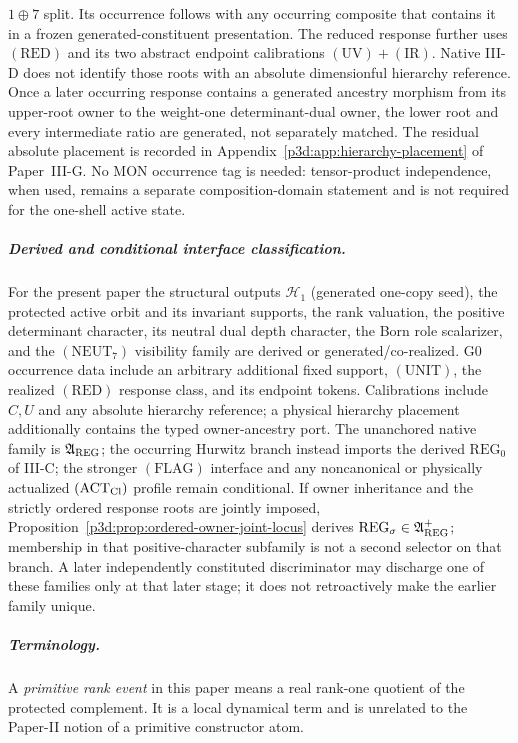 \documentclass[12pt,a4paper]{article}
\begin{document}
\(1\oplus7\) split.  Its occurrence follows with any occurring composite that
contains it in a frozen generated-constituent presentation.  The reduced response further uses
\((\mathrm{RED})\) and its two abstract endpoint calibrations
\((\mathrm{UV})+(\mathrm{IR})\).  Native III-D does not identify those roots
with an absolute dimensionful hierarchy reference.  Once a later occurring
response contains a generated ancestry morphism from its upper-root owner to
the weight-one determinant-dual owner, the lower root and every intermediate
ratio are generated, not separately matched.
The residual absolute placement is recorded in
Appendix~\ref{p3d:app:hierarchy-placement} of Paper~III-G.  No MON
occurrence tag is needed: tensor-product independence, when used, remains a
separate composition-domain statement and is not required for the one-shell
active state.

\subparagraph{Derived and conditional interface classification.}
For the present paper the structural outputs
\(\mathcal H_1\) (generated one-copy seed), the protected active orbit and its invariant
supports, the rank valuation, the positive determinant character, its neutral
dual depth character, the
Born role scalarizer, and the \((\mathrm{NEUT}_7)\) visibility family are
derived or generated/co-realized.  G0 occurrence data include an arbitrary
additional fixed support, \((\mathrm{UNIT})\), the realized
\((\mathrm{RED})\) response class, and its endpoint tokens.  Calibrations
include \(C,U\) and any absolute hierarchy reference; a physical hierarchy
placement additionally contains the typed owner-ancestry port.  The unanchored native family is \(\mathfrak A_{\rm REG}\); the occurring Hurwitz branch instead imports the derived \(\mathrm{REG}_0\) of III-C; the stronger
\((\mathrm{FLAG})\) interface and any noncanonical or physically actualized
\((\mathrm{ACT}_{\rm Cl})\) profile remain conditional.  If owner inheritance and the strictly ordered response roots
are jointly imposed, Proposition~\ref{p3d:prop:ordered-owner-joint-locus}
derives \(\mathrm{REG}_\sigma\in\mathfrak A_{\rm REG}^{+}\); membership in
that positive-character subfamily is not a second selector on that branch.
A later independently constituted discriminator may discharge
one of these families only at that later stage; it does not retroactively make
the earlier family unique.

\subparagraph{Terminology.}
A \emph{primitive rank event} in this paper means a real rank-one quotient of
the protected complement.  It is a local dynamical term and is unrelated to
the Paper-II notion of a primitive constructor atom.
\end{document}
